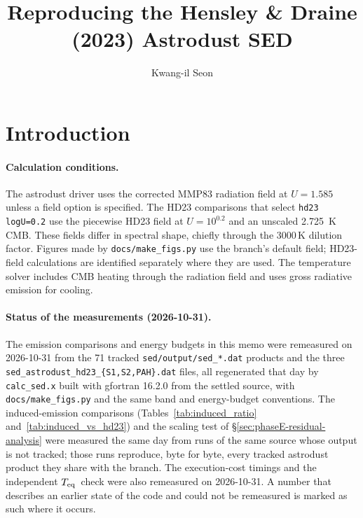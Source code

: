 \documentclass{my_memo}
\title{Reproducing the Hensley \& Draine (2023) Astrodust SED}
\author{Kwang-il Seon}
\date{\docmoddate}
\newcommand{\Teq}{\ensuremath{T_{\rm eq}}}
\begin{document}
\maketitle

\section{Introduction}

\paragraph{Calculation conditions.}
The astrodust driver uses the corrected MMP83 radiation field at
$U=1.585$ unless a field option is specified. The HD23 comparisons that
select \texttt{hd23 logU=0.2} use the piecewise HD23 field at
$U=10^{0.2}$ and an unscaled \SI{2.725}{K} CMB. These fields differ in
spectral shape, chiefly through the 3000\,K dilution factor. Figures
made by \texttt{docs/make\_figs.py} use the branch's default field;
HD23-field calculations are identified separately where they are used.
The temperature solver includes CMB heating through the radiation field
and uses gross radiative emission for cooling.

\paragraph{Status of the measurements (2026-10-31).}
The emission comparisons and energy budgets in this memo were remeasured
on 2026-10-31 from the 71 tracked \texttt{sed/output/sed\_*.dat}
products and the three \texttt{sed\_astrodust\_hd23\_\{S1,S2,PAH\}.dat}
files, all regenerated that day by \texttt{calc\_sed.x} built with
gfortran 16.2.0 from the settled source, with \texttt{docs/make\_figs.py}
and the same band and energy-budget conventions. The induced-emission
comparisons (Tables~\ref{tab:induced_ratio} and~\ref{tab:induced_vs_hd23})
and the scaling test of \S\ref{sec:phaseE-residual-analysis} were
measured the same day from runs of the same source whose output is not
tracked; those runs reproduce, byte for byte, every tracked astrodust
product they share with the branch. The execution-cost timings and the
independent \Teq\ check were also remeasured on 2026-10-31. A number that
describes an earlier state of the code and could not be remeasured is
marked as such where it occurs.
\end{document}
